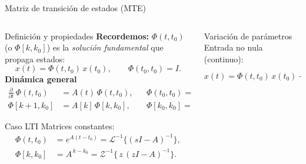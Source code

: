 \documentclass[
    10pt,
    aspectratio=169,
    xcolor={dvipsnames},
    spanish,
    ]{beamer}
\begin{document}
\begin{frame}{Matriz de transición de estados (MTE)}
\footnotesize
\begin{columns}
  \begin{column}{0.52\textwidth}
    \begin{block}{Definición y propiedades}
      	\textbf{Recordemos:} $\Phi(t,t_0)$ (o $\Phi[k,k_0]$) es la \emph{solución fundamental} que propaga estados:
      \[x(t)=\Phi(t,t_0)\,x(t_0),\qquad \Phi(t_0,t_0)=I.\]
      	\textbf{Dinámica general}
      \begin{align}
        \frac{\partial}{\partial t}\,\Phi(t,t_0)&=A(t)\,\Phi(t,t_0), && \Phi(t_0,t_0)=I, \\[2pt]
      \Phi[k{+}1,k_0]&=A[k]\,\Phi[k,k_0], && \Phi[k_0,k_0]=I.
      \end{align}
    \end{block}

    \begin{block}{Caso LTI}
      Matrices constantes:
      \begin{align}
      \Phi(t,t_0)&=e^{A(t-t_0)}=\mathcal{L}^{-1}\!\{(sI-A)^{-1}\},\\
      \Phi[k,k_0]&=A^{\,k-k_0}=\mathcal{Z}^{-1}\!\{\,z\,(zI-A)^{-1}\}.
      \end{align}
    \end{block}
  \end{column}
  \begin{column}{0.46\textwidth}
    \begin{block}{Variación de parámetros}
      Entrada no nula (continuo):
      \[x(t)=\Phi(t,t_0)\,x(t_0)+\int_{t_0}^{t}\!\Phi(t,\tau)\,B(\tau)\,u(\tau)\,d\tau.\]
    \end{block}
  \end{column}
\end{columns}
\end{frame}
\end{document}
